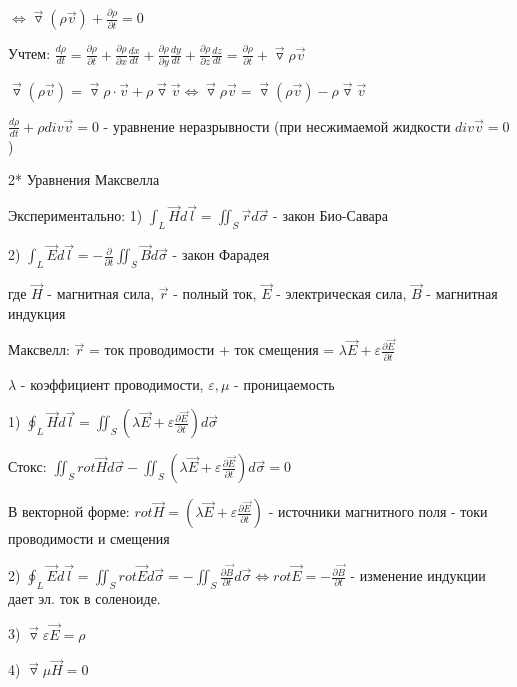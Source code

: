 \documentclass[12pt]{article}
\begin{document}
    $\Longleftrightarrow \overrightarrow{\triangledown} (\rho \overrightarrow{v}) + \frac{\partial \rho}{\partial t} = 0$

    Учтем: $\frac{d \rho}{dt} = \frac{\partial \rho}{\partial t} +  \frac{\partial \rho}{\partial x} \frac{dx}{dt} +  \frac{\partial \rho}{\partial y} \frac{dy}{dt} +  \frac{\partial \rho}{\partial z} \frac{dz}{dt} = \frac{\partial \rho}{\partial t} + \overrightarrow{\triangledown} \rho \overrightarrow{v}$


    $\overrightarrow{\triangledown} (\rho \overrightarrow{v}) = \overrightarrow{\triangledown} \rho \cdot \overrightarrow{v} + \rho \overrightarrow{\triangledown} \overrightarrow{v} \Longleftrightarrow \overrightarrow{\triangledown} \rho \overrightarrow{v} = \overrightarrow{\triangledown} (\rho \overrightarrow{v}) - \rho \overrightarrow{\triangledown} \overrightarrow{v}$

    $\frac{d\rho}{dt} + \rho div \overrightarrow{v} = 0$ - уравнение неразрывности (при несжимаемой жидкости $div \overrightarrow{v} = 0$)

    2* Уравнения Максвелла

    Экспериментально: 1) $\int_L \overrightarrow{H} d\overrightarrow{l} = \iint_S \overrightarrow{r}d\overrightarrow{\sigma}$ - закон Био-Савара

    2) $\int_L \overrightarrow{E} d\overrightarrow{l} = -\frac{\partial}{\partial t} \iint_S \overrightarrow{B}d\overrightarrow{\sigma}$ - закон Фарадея

    где $\overrightarrow{H}$ - магнитная сила, $\overrightarrow{r}$ - полный ток, $\overrightarrow{E}$ - электрическая сила, $\overrightarrow{B}$ - магнитная индукция

    Максвелл: $\overrightarrow{r}$ = ток проводимости + ток смещения = $\lambda \overrightarrow{E} + \varepsilon \frac{\partial \overrightarrow{E}}{\partial t}$

    $\lambda$ - коэффициент проводимости, $\varepsilon, \mu$ - проницаемость

    1) $\oint_L \overrightarrow{H} d\overrightarrow{l} = \iint_S (\lambda \overrightarrow{E} + \varepsilon \frac{\partial \overrightarrow{E}}{\partial t}) d\overrightarrow{\sigma}$

    Стокс: $\iint_S rot \overrightarrow{H} d\overrightarrow{\sigma} - \iint_S (\lambda \overrightarrow{E} + \varepsilon \frac{\partial \overrightarrow{E}}{\partial t}) d\overrightarrow{\sigma} = 0$

    В векторной форме: $rot \overrightarrow{H} = (\lambda \overrightarrow{E} + \varepsilon \frac{\partial \overrightarrow{E}}{\partial t})$ - источники магнитного поля - токи проводимости и смещения

    2) $\oint_L \overrightarrow{E}d\overrightarrow{l} = \iint_S rot \overrightarrow{E}d\overrightarrow{\sigma} = -\iint_S \frac{\partial \overrightarrow{B}}{\partial t}d\overrightarrow{\sigma} \Longleftrightarrow
    rot \overrightarrow{E} = -\frac{\partial \overrightarrow{B}}{\partial t}$ - изменение индукции дает эл. ток в соленоиде.

    3) $\overrightarrow{\triangledown} \varepsilon \overrightarrow{E} = \rho$

    4) $\overrightarrow{\triangledown} \mu \overrightarrow{H} = 0$
\end{document}
